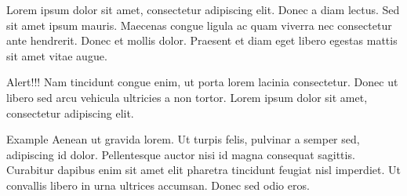 \documentclass[compress]{beamer}
\begin{document}
  \begin{frame}{}
    \begin{theorem}
  Lorem ipsum dolor sit amet, consectetur adipiscing elit. Donec a diam lectus. Sed sit amet ipsum mauris. Maecenas congue ligula ac quam viverra nec consectetur ante hendrerit. Donec et mollis dolor. Praesent et diam eget libero egestas mattis sit amet vitae augue. 
\end{theorem}

    \begin{alertblock}{Alert!!!}
 Nam tincidunt congue enim, ut porta lorem lacinia consectetur. Donec ut libero sed arcu vehicula ultricies a non tortor. Lorem ipsum dolor sit amet, consectetur adipiscing elit. 
  \end{alertblock}

 \begin{exampleblock}{Example}
  Aenean ut gravida lorem. Ut turpis felis, pulvinar a semper sed, adipiscing id dolor. Pellentesque auctor nisi id magna consequat sagittis. Curabitur dapibus enim sit amet elit pharetra tincidunt feugiat nisl imperdiet. Ut convallis libero in urna ultrices accumsan. Donec sed odio eros.
 \end{exampleblock}
  \end{frame}
\end{document}
